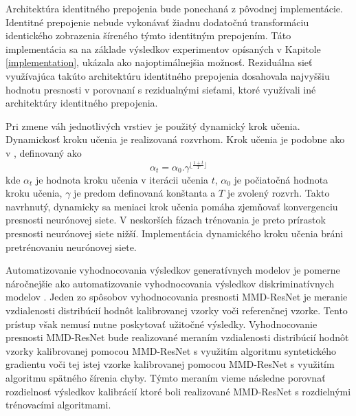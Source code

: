 Architektúra identitného prepojenia bude ponechaná z pôvodnej implementácie.
Identitné prepojenie nebude vykonávať žiadnu dodatočnú transformáciu identického zobrazenia šíreného týmto identitným prepojením. Táto implementácia sa na základe výsledkov experimentov opísaných v Kapitole \ref{implementation}, ukázala ako najoptimálnejšia možnosť. Reziduálna sieť využívajúca takúto architektúru identitného prepojenia dosahovala najvyššiu hodnotu presnosti v porovnaní s rezidualnými sieťami, ktoré využívali iné architektúry identitného prepojenia.


Pri zmene váh jednotlivých vrstiev je použitý dynamický krok učenia. Dynamickosť kroku učenia je realizovaná rozvrhom. Krok učenia je podobne ako v \cite{Li2017}, definovaný ako 
\begin{equation}
\label{dyna_lr}
    \alpha_t = \alpha_0 . \gamma^{\lfloor\frac{1+t}{T}\rfloor}
\end{equation}
kde $\alpha_t$ je hodnota kroku učenia v iterácii učenia $t$, $\alpha_0$ je počiatočná hodnota kroku učenia, $\gamma$ je predom definovaná konštanta a $T$ je zvolený rozvrh. Takto navrhnutý, dynamicky sa meniaci krok učenia pomáha zjemňovať konvergenciu presnosti neurónovej siete. V neskorších fázach trénovania je preto prírastok presnosti neurónovej siete nižší. Implementácia dynamického kroku učenia bráni pretrénovaniu neurónovej siete.

Automatizovanie vyhodnocovania výsledkov generatívnych modelov je pomerne náročnejšie ako automatizovanie vyhodnocovania výsledkov diskriminatívnych modelov \cite{Bethge2016}. Jeden zo spôsobov vyhodnocovania presnosti MMD-ResNet je meranie vzdialenosti distribúcií hodnôt kalibrovanej vzorky voči referenčnej vzorke. Tento prístup však nemusí nutne poskytovať užitočné výsledky. Vyhodnocovanie presnosti MMD-ResNet bude realizované meraním vzdialenosti distribúcií hodnôt vzorky kalibrovanej pomocou MMD-ResNet s využitím algoritmu syntetického gradientu voči tej istej vzorke kalibrovanej pomocou MMD-ResNet s využitím algoritmu spätného šírenia chyby. Týmto meraním vieme následne porovnať rozdielnosť výsledkov kalibrácií ktoré boli realizované MMD-ResNet s rozdielnými trénovacími algoritmami.

